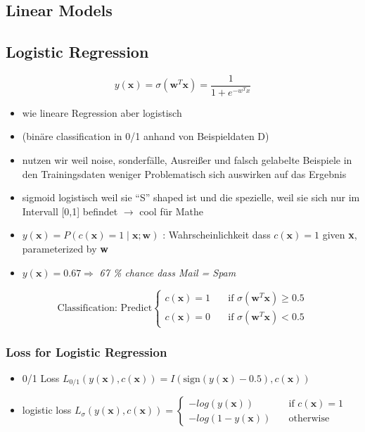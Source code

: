 \documentclass[11pt,a4paper]{article}
\begin{document}
\begin{flushleft}
\section{Linear Models}
\subsection{Logistic Regression}
$$ y(\textbf{x}) = \sigma (\textbf{w}^{T} \textbf{x}) = \frac{1}{1+ e^{-w^Tx}} $$
\begin{itemize}
\item wie lineare Regression aber logistisch
\item(binäre classification in 0/1 anhand von Beispieldaten D)
\item nutzen wir weil noise, sonderfälle, Ausreißer und falsch gelabelte Beispiele in den Trainingsdaten weniger Problematisch sich auswirken auf das Ergebnis
\item sigmoid logistisch weil sie “S” shaped ist und die spezielle, weil sie sich nur im Intervall [0,1] befindet $\rightarrow$ cool für Mathe
\item $y(\textbf{x}) = P(c(\textbf{x})= 1 \mid \textbf{x};\textbf{w})$ : Wahrscheinlichkeit dass $c(\textbf{x}) = 1$ given \textbf{x}, parameterized by \textbf{w}
\item $ y(\textbf{x}) = 0.67 \Rightarrow $ \textit{67 \% chance dass Mail = Spam }
\end{itemize}

$$ \text{Classification: Predict} \begin{cases}
c(\textbf{x}) = 1      & \quad \text{if } \sigma (\textbf{w}^T \textbf{x}) \geq 0.5 \\
c(\textbf{x}) = 0    & \quad \text{if } \sigma (\textbf{w}^T \textbf{x}) < 0.5
\end{cases} $$
\subsubsection{Loss for Logistic Regression}
\begin{itemize}
\item 0/1 Loss $ L_{0/1} (y(\textbf{x}), c(\textbf{x})) = I (\text{sign} (y(\textbf{x})-0.5) , c(\textbf{x})) $
\item logistic loss $  L_{\sigma} (y(\textbf{x}), c(\textbf{x})) = \begin{cases}
-log(y(\textbf{x}))      & \quad \text{if } c(\textbf{x}) = 1 \\
-log(1 - y(\textbf{x}))      & \quad \text{otherwise }
\end{cases} $
\end{itemize}

\end{flushleft}
\end{document}
